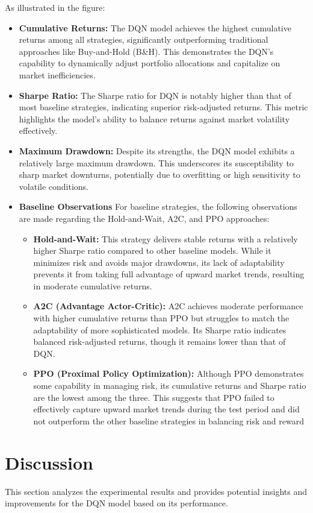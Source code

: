 \documentclass[conference]{IEEEtran}
\begin{document}
As illustrated in the figure:
\begin{itemize}
    \item \textbf{Cumulative Returns:} The DQN model achieves the highest cumulative returns among all strategies, significantly outperforming traditional approaches like Buy-and-Hold (B\&H). This demonstrates the DQN's capability to dynamically adjust portfolio allocations and capitalize on market inefficiencies.
    \item \textbf{Sharpe Ratio:} The Sharpe ratio for DQN is notably higher than that of most baseline strategies, indicating superior risk-adjusted returns. This metric highlights the model's ability to balance returns against market volatility effectively.
    \item \textbf{Maximum Drawdown:} Despite its strengths, the DQN model exhibits a relatively large maximum drawdown. This underscores its susceptibility to sharp market downturns, potentially due to overfitting or high sensitivity to volatile conditions.
    \item \textbf{Baseline Observations}
For baseline strategies, the following observations are made regarding the Hold-and-Wait, A2C, and PPO approaches:
\begin{itemize}
    \item \textbf{Hold-and-Wait:} This strategy delivers stable returns with a relatively higher Sharpe ratio compared to other baseline models. While it minimizes risk and avoids major drawdowns, its lack of adaptability prevents it from taking full advantage of upward market trends, resulting in moderate cumulative returns.
    \item \textbf{A2C (Advantage Actor-Critic):} A2C achieves moderate performance with higher cumulative returns than PPO but struggles to match the adaptability of more sophisticated models. Its Sharpe ratio indicates balanced risk-adjusted returns, though it remains lower than that of DQN.
    \item \textbf{PPO (Proximal Policy Optimization):} Although PPO demonstrates some capability in managing risk, its cumulative returns and Sharpe ratio are the lowest among the three. This suggests that PPO failed to effectively capture upward market trends during the test period and did not outperform the other baseline strategies in balancing risk and reward
\end{itemize}

\end{itemize}

\section{Discussion}
This section analyzes the experimental results and provides potential insights and improvements for the DQN model based on its performance.
\end{document}
